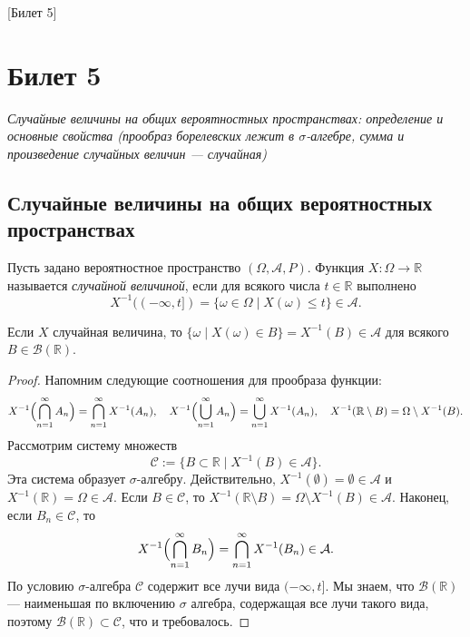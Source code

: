 [Билет 5]

\section{Билет 5}

\begin{center}
    \it Случайные величины на общих вероятностных пространствах: определение и основные свойства (прообраз борелевских лежит в $\sigma$-алгебре, сумма и произведение случайных величин --- случайная)
\end{center}

\sectionbreak
\subsection{Случайные величины на общих вероятностных пространствах}

\begin{definition}
    Пусть задано вероятностное пространство $(\Omega, \mathcal{A}, P)$.
    Функция $X \colon \Omega \to \mathbb{R}$ называется {\it случайной величиной}, если
    для всякого числа $t \in \mathbb{R}$ выполнено
    \[
        X^{-1}((-\infty, t]) = \{\omega \in \Omega \mid X(\omega) \leqslant t\} \in \mathcal{A}.
    \]
\end{definition}

\begin{proposal*}
    Если $X$ случайная величина, то $\{\omega \mid X(\omega) \in B\} = X^{-1}(B) \in \mathcal{A}$ для всякого $B \in \mathcal{B}(\mathbb{R})$.
\end{proposal*}

\begin{proof}
    Напомним следующие соотношения для прообраза функции:
    \[
        X^{-1}\Bigl( \bigcap\limits_{n=1}^\infty A_n \Bigr) = \bigcap\limits_{n=1}^\infty X^{-1}(A_n), \quad X^{-1}\Bigl(\bigcup\limits_{n = 1}^\infty A_n\Bigr) = \bigcup\limits_{n = 1}^\infty X^{-1}(A_n), \quad X^{-1}(\mathbb{R} \setminus B) = \Omega \setminus X^{-1}(B).
    \]
    Рассмотрим систему множеств
    \[
        \mathcal{C} := \{B \subset \mathbb{R} \mid X^{-1}(B) \in \mathcal{A}\}.
    \]
    Эта система образует $\sigma$-алгебру.
    Действительно, $X^{-1}(\emptyset) = \emptyset \in \mathcal{A}$ и
    $X^{-1}(\mathbb{R}) = \Omega \in \mathcal{A}$.
    Если $B \in \mathcal{C}$, то $X^{-1}(\mathbb{R} \setminus B) = \Omega \setminus X^{-1}(B) \in \mathcal{A}$.
    Наконец, если $B_n \in \mathcal{C}$, то
    \[
        X^{-1}\Bigl(\bigcap\limits_{n = 1}^\infty B_n\Bigr) = \bigcap\limits_{n = 1}^\infty X^{-1}(B_n) \in \mathcal{A}.
    \]
    По условию $\sigma$-алгебра $\mathcal{C}$ содержит все лучи вида $(-\infty, t]$.
    Мы знаем, что $\mathcal{B}(\mathbb{R})$ --- наименьшая по включению $\sigma$ алгебра, содержащая все лучи такого вида, поэтому $\mathcal{B}(\mathbb{R}) \subset \mathcal{C}$, что и требовалось.
\end{proof}

